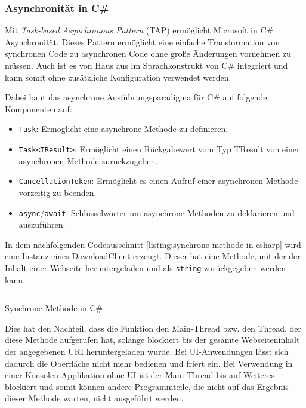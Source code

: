 \subsubsection{Asynchronität in C\#}
\label{subsubsec:ansynchronitaet-in-csharp}

Mit \textit{Task-based Asynchronous Pattern} (TAP) ermöglicht Microsoft in C\# Asynchronität. Dieses Pattern ermöglicht eine einfache Transformation von synchronen Code zu asynchronen Code ohne große Änderungen vornehmen zu müssen. Auch ist es von Haus aus im Sprachkonstrukt von C\# integriert und kann somit ohne zusätzliche Konfiguration verwendet werden.

Dabei baut das asynchrone Ausführungsparadigma für C\# auf folgende Komponenten auf:
\begin{itemize}
    \item \texttt{Task}: Ermöglicht eine asynchrone Methode zu definieren.
    \item \texttt{Task<TResult>}: Ermöglicht einen Rückgabewert vom Typ TResult von einer asynchronen Methode zurückzugeben.
    \item \texttt{CancellationToken}: Ermöglicht es einen Aufruf einer asynchronen Methode vorzeitig zu beenden.
    \item \texttt{async}/\texttt{await}: Schlüsselwörter um asynchrone Methoden zu deklarieren und auszuführen.
\end{itemize}

In dem nachfolgenden Codeausschnitt \ref{listing:synchrone-methode-in-csharp} wird eine Instanz eines DownloadClient erzeugt. Dieser hat eine Methode, mit der der Inhalt einer Webseite heruntergeladen und als \texttt{string} zurückgegeben werden kann.

\begin{listing}[H]
    \inputminted[framesep=2mm, baselinestretch=1.2, fontsize=\normalsize, linenos]{csharp}{codes/example_synchronous.cs}
    \caption{Synchrone Methode in C\#}
    \label{listing:synchrone-methode-in-csharp}
\end{listing}

Dies hat den Nachteil, dass die Funktion den Main-Thread bzw. den Thread, der diese Methode aufgerufen hat, solange blockiert bis der gesamte Webseiteninhalt der angegebenen URI heruntergeladen wurde. Bei UI-Anwendungen lässt sich dadurch die Oberfläche nicht mehr bedienen und friert ein. Bei Verwendung in einer Konsolen-Applikation ohne UI ist der Main-Thread bis auf Weiteres blockiert und somit können andere Programmteile, die nicht auf das Ergebnis dieser Methode warten, nicht ausgeführt werden.

